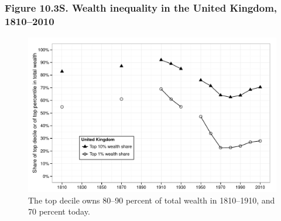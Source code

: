 \documentclass[t]{beamer}\usepackage[]{graphicx}\usepackage[]{color}
\newenvironment{knitrout}{}{} %
\begin{document}
\begin{frame}[label=Figure_10_3S]
\frametitle{Figure 10.3S. Wealth inequality in the United Kingdom, 1810--2010}
\begin{figure}[t]
\begin{minipage}[b]{\textwidth}
\centering
\begin{knitrout}\footnotesize
{}\color{fgcolor}

{\centering \includegraphics[width=1\linewidth]{figures/bw/Figure_10_3S} 

}



\end{knitrout}
\caption{The top decile owns 80--90 percent of total wealth in 1810--1910, and 70 percent today.}
\end{minipage}
\end{figure}
\end{frame}
\end{document}
